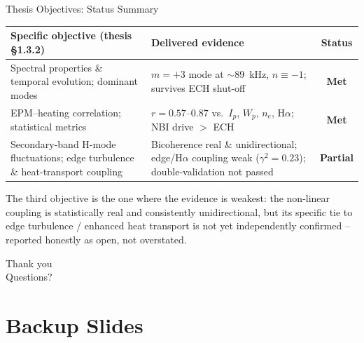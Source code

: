 \documentclass[aspectratio=169]{beamer}
\begin{document}
\begin{frame}{Thesis Objectives: Status Summary}
    \footnotesize
    \begin{center}
    \renewcommand{\arraystretch}{1.3}
    \begin{tabular}{p{6.4cm}p{5.7cm}c}
        \toprule
        Specific objective (thesis \S1.3.2) & Delivered evidence & Status \\
        \midrule
        Spectral properties \& temporal evolution; dominant modes &
        $m={+}3$ mode at $\sim$\SI{89}{kHz}, $n\equiv{-}1$; survives ECH shut-off &
        \textbf{Met} \\
        EPM--heating correlation; statistical metrics &
        $r=0.57$--$0.87$ vs.\ $I_p$, $W_p$, $n_e$, H$\alpha$; NBI drive $>$ ECH &
        \textbf{Met} \\
        Secondary-band H-mode fluctuations; edge turbulence \& heat-transport coupling &
        Bicoherence real \& unidirectional; edge/H$\alpha$ coupling weak
        ($\gamma^2=0.23$); double-validation not passed &
        \textbf{Partial} \\
        \bottomrule
    \end{tabular}
    \end{center}
    \vspace{0.3cm}
    \normalsize
    The third objective is the one where the evidence is weakest: the
    non-linear coupling is statistically real and consistently unidirectional,
    but its specific tie to edge turbulence / enhanced heat transport is not yet
    independently confirmed -- reported honestly as open, not overstated.
\end{frame}

\begin{frame}
    \begin{center}
        {\Huge Thank you}\\[0.5cm]
        {\Large Questions?}
    \end{center}
\end{frame}

\appendix
\section{Backup Slides}
\end{document}
